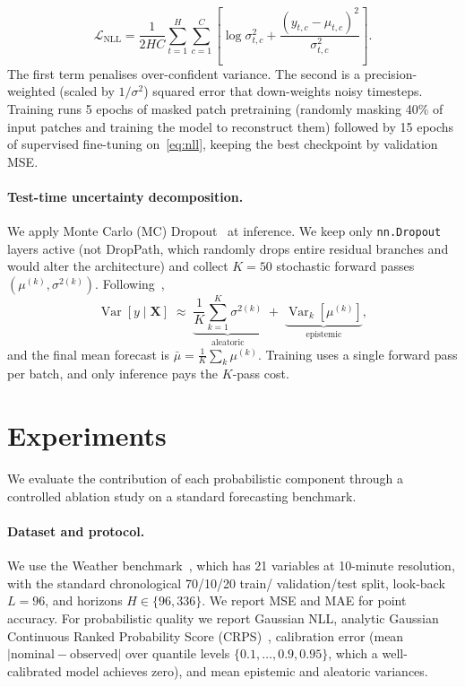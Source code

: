 \documentclass{llncs}
\begin{document}
\begin{equation}
    \mathcal{L}_{\mathrm{NLL}}
    = \frac{1}{2HC}\sum_{t=1}^{H}\sum_{c=1}^{C}\!\left[\log\sigma_{t,c}^{2}+\frac{(y_{t,c}-\mu_{t,c})^{2}}{\sigma_{t,c}^{2}}\right].
    \label{eq:nll}
\end{equation}
The first term penalises over-confident variance. The second is a precision-weighted (scaled by $1/\sigma^2$) squared error that down-weights noisy timesteps. Training runs 5 epochs of masked patch pretraining (randomly masking 40\% of input patches and training the model to reconstruct them) followed by 15 epochs of supervised fine-tuning on~\eqref{eq:nll}, keeping the best checkpoint by validation MSE.

\paragraph{Test-time uncertainty decomposition.}
We apply Monte Carlo (MC) Dropout~\cite{gal2016dropout} at inference. We keep only \texttt{nn.Dropout} layers active (not DropPath, which randomly drops entire residual branches and would alter the architecture) and collect $K{=}50$ stochastic forward passes $(\mu^{(k)},\sigma^{2(k)})$. Following~\cite{kendall2017uncertainties},
\begin{equation}
    \operatorname{Var}[y\mid\mathbf{X}]
    \;\approx\;
    \underbrace{\frac{1}{K}\sum_{k=1}^{K}\sigma^{2(k)}}_{\text{aleatoric}}
    \;+\;
    \underbrace{\operatorname{Var}_{k}\!\left[\mu^{(k)}\right]}_{\text{epistemic}},
    \label{eq:decomp}
\end{equation}
and the final mean forecast is $\bar{\mu}=\tfrac{1}{K}\sum_{k}\mu^{(k)}$. Training uses a single forward pass per batch, and only inference pays the $K$-pass cost. 

\section{Experiments}
\label{sec:experiments}
We evaluate the contribution of each probabilistic component through a controlled ablation study on a standard forecasting benchmark.
\paragraph{Dataset and protocol.}
We use the Weather benchmark~\cite{zhou2021informer}, which has 21 variables at 10-minute resolution, with the standard chronological 70/10/20 train/ validation/test split, look-back $L{=}96$, and horizons $H\in\{96,336\}$. We report MSE and MAE for point accuracy. For probabilistic quality we report Gaussian NLL, analytic Gaussian Continuous Ranked Probability Score (CRPS)~\cite{gneiting2007strictly}, calibration error (mean $|{\text{nominal}-\text{observed}}|$ over quantile levels $\{0.1,\dots,0.9,0.95\}$, which a well-calibrated model achieves zero), and mean epistemic and aleatoric variances.
\end{document}
